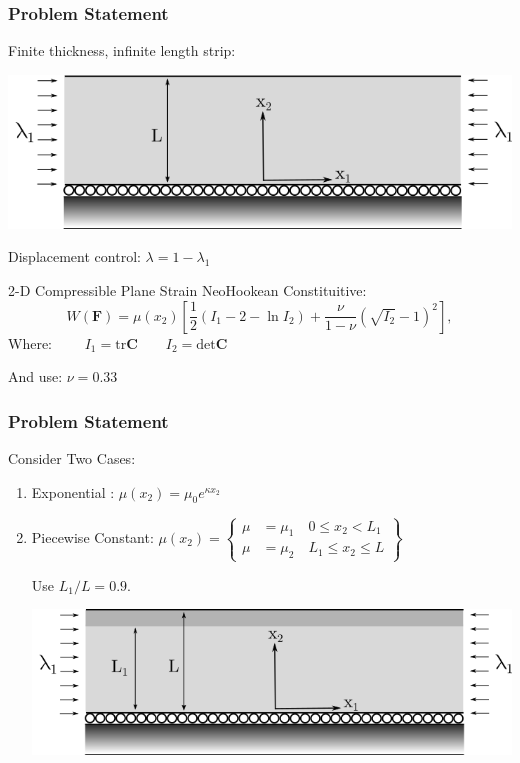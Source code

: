 \documentclass{beamer}
\begin{document}
\begin{frame}
	\frametitle{\large Problem Statement}
	Finite thickness, infinite length strip:
	\begin{center}	
		\includegraphics[scale=0.4]{myFigures/compressed_strip_drawing}
	\end{center}
	
	Displacement control: $\lambda = 1 - \lambda_1$
	
	2-D Compressible Plane Strain NeoHookean Constituitive:
	\begin{equation*} 
		W(\mathbf{F})=\mu(x_2)\left[\frac{1}{2}(I_1 - 2- \ln{I_2}) + \frac{\nu}{1-\nu}(\sqrt{I_2} - 	1)^2\right],
	\end{equation*}
	Where:	$\qquad I_1 = \mathrm{tr}\mathbf{C} \qquad I_2 = \mathrm{det} \mathbf{C} $	
	
	\vspace{0.05in}
	And use: $\nu = 0.33$
	
\end{frame}

\begin{frame}
	\frametitle{\large Problem Statement}
	
	Consider Two Cases:
	\begin{enumerate}
	\item  Exponential : $\mu(x_2) = \mu_0 e^{\kappa x_2}$
	\item  Piecewise Constant: $
\mu(x_2) = 
\left \{ 
\begin{aligned} 
  \mu &= \mu_1 \quad 0 \leq x_2 < L_1 \\
  \mu &= \mu_2 \quad L_1 \leq x_2 \leq L
\end{aligned} 
\right \}$

\begin{flushright}
Use $L_1/L = 0.9$. 
\end{flushright}


\vspace{0.1 in}
	\begin{center}
		\includegraphics[scale=0.4]{myFigures/compressed_strip_drawing_piece_const}
	\end{center}
	\end{enumerate}
	
\end{frame}
\end{document}
